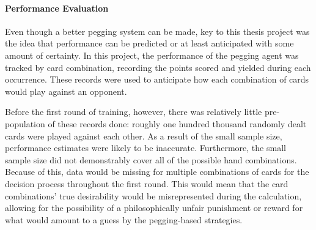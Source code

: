 \paragraph*{Performance Evaluation}

Even though a better pegging system can be made,
key to this thesis project was the idea that performance can be predicted
or at least anticipated with some amount of certainty.
%
In this project,
the performance of the pegging agent was tracked by card combination,
recording the points scored and yielded during each occurrence.
%
These records were used to anticipate how each combination of cards would
play against an opponent.

Before the first round of training,
however,
there was relatively little pre-population of these records done:
roughly one hundred thousand randomly dealt cards were played against each
other.
%
As a result of the small sample size,
performance estimates were likely to be inaccurate.
%
Furthermore,
the small sample size did not demonstrably cover all of the possible hand
combinations.
%
Because of this,
data would be missing for multiple combinations of cards
for the decision process
throughout the first round.
%
This would mean that the card combinations' true desirability would be
misrepresented during the calculation,
allowing for the possibility of a philosophically unfair
punishment or reward for what would amount to a guess by the
pegging-based strategies.

